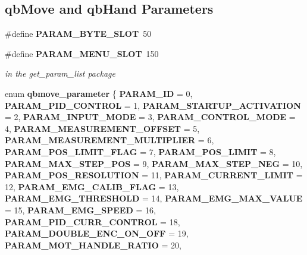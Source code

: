 \subsection*{qb\+Move and qb\+Hand Parameters}
\begin{DoxyCompactItemize}
\item 
\#define \textbf{ P\+A\+R\+A\+M\+\_\+\+B\+Y\+T\+E\+\_\+\+S\+L\+OT}~50
\item 
\#define \textbf{ P\+A\+R\+A\+M\+\_\+\+M\+E\+N\+U\+\_\+\+S\+L\+OT}~150
\begin{DoxyCompactList}\small\item\em in the get\+\_\+param\+\_\+list package \end{DoxyCompactList}\item 
enum \textbf{ qbmove\+\_\+parameter} \{ \newline
\textbf{ P\+A\+R\+A\+M\+\_\+\+ID} = 0, 
\textbf{ P\+A\+R\+A\+M\+\_\+\+P\+I\+D\+\_\+\+C\+O\+N\+T\+R\+OL} = 1, 
\textbf{ P\+A\+R\+A\+M\+\_\+\+S\+T\+A\+R\+T\+U\+P\+\_\+\+A\+C\+T\+I\+V\+A\+T\+I\+ON} = 2, 
\textbf{ P\+A\+R\+A\+M\+\_\+\+I\+N\+P\+U\+T\+\_\+\+M\+O\+DE} = 3, 
\newline
\textbf{ P\+A\+R\+A\+M\+\_\+\+C\+O\+N\+T\+R\+O\+L\+\_\+\+M\+O\+DE} = 4, 
\textbf{ P\+A\+R\+A\+M\+\_\+\+M\+E\+A\+S\+U\+R\+E\+M\+E\+N\+T\+\_\+\+O\+F\+F\+S\+ET} = 5, 
\textbf{ P\+A\+R\+A\+M\+\_\+\+M\+E\+A\+S\+U\+R\+E\+M\+E\+N\+T\+\_\+\+M\+U\+L\+T\+I\+P\+L\+I\+ER} = 6, 
\textbf{ P\+A\+R\+A\+M\+\_\+\+P\+O\+S\+\_\+\+L\+I\+M\+I\+T\+\_\+\+F\+L\+AG} = 7, 
\newline
\textbf{ P\+A\+R\+A\+M\+\_\+\+P\+O\+S\+\_\+\+L\+I\+M\+IT} = 8, 
\textbf{ P\+A\+R\+A\+M\+\_\+\+M\+A\+X\+\_\+\+S\+T\+E\+P\+\_\+\+P\+OS} = 9, 
\textbf{ P\+A\+R\+A\+M\+\_\+\+M\+A\+X\+\_\+\+S\+T\+E\+P\+\_\+\+N\+EG} = 10, 
\textbf{ P\+A\+R\+A\+M\+\_\+\+P\+O\+S\+\_\+\+R\+E\+S\+O\+L\+U\+T\+I\+ON} = 11, 
\newline
\textbf{ P\+A\+R\+A\+M\+\_\+\+C\+U\+R\+R\+E\+N\+T\+\_\+\+L\+I\+M\+IT} = 12, 
\textbf{ P\+A\+R\+A\+M\+\_\+\+E\+M\+G\+\_\+\+C\+A\+L\+I\+B\+\_\+\+F\+L\+AG} = 13, 
\textbf{ P\+A\+R\+A\+M\+\_\+\+E\+M\+G\+\_\+\+T\+H\+R\+E\+S\+H\+O\+LD} = 14, 
\textbf{ P\+A\+R\+A\+M\+\_\+\+E\+M\+G\+\_\+\+M\+A\+X\+\_\+\+V\+A\+L\+UE} = 15, 
\newline
\textbf{ P\+A\+R\+A\+M\+\_\+\+E\+M\+G\+\_\+\+S\+P\+E\+ED} = 16, 
\textbf{ P\+A\+R\+A\+M\+\_\+\+P\+I\+D\+\_\+\+C\+U\+R\+R\+\_\+\+C\+O\+N\+T\+R\+OL} = 18, 
\textbf{ P\+A\+R\+A\+M\+\_\+\+D\+O\+U\+B\+L\+E\+\_\+\+E\+N\+C\+\_\+\+O\+N\+\_\+\+O\+FF} = 19, 
\textbf{ P\+A\+R\+A\+M\+\_\+\+M\+O\+T\+\_\+\+H\+A\+N\+D\+L\+E\+\_\+\+R\+A\+T\+IO} = 20, 

\end{DoxyCompactItemize}
